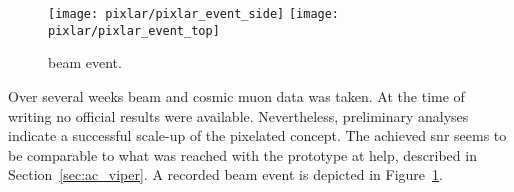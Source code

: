 \begin{figure}[htb]
	\centering
	\texttt{[image: pixlar/pixlar\_event\_side]}
	\texttt{[image: pixlar/pixlar\_event\_top]}
	\caption[\pixlar{} beam event]{%
		\pixlar{} beam event.
	}
	\label{fig:pixlar_event}
\end{figure}

Over several weeks beam and cosmic muon data was taken.
At the time of writing no official results were available.
Nevertheless, preliminary analyses indicate a successful scale-up of the pixelated \lartpc{} concept.
The achieved \gls{snr} seems to be comparable to what was reached with the prototype at \gls{help}, described in Section~\ref{sec:ac_viper}.
A recorded beam event is depicted in Figure~\ref{fig:pixlar_event}.